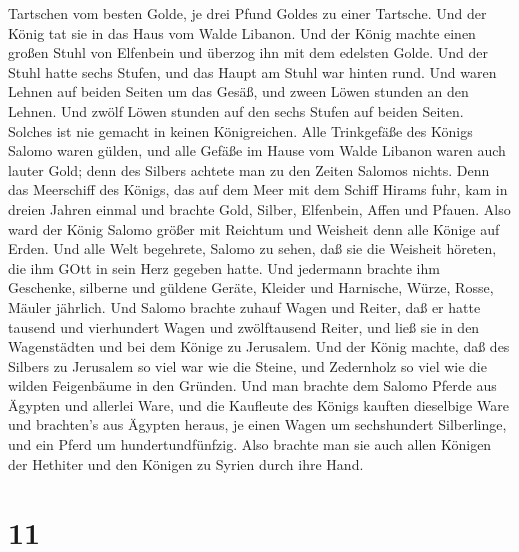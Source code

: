 Tartschen vom besten Golde, je drei Pfund Goldes zu einer Tartsche. Und
der König tat sie in das Haus vom Walde Libanon.  Und der
König machte einen großen Stuhl von Elfenbein und überzog ihn mit dem
edelsten Golde.  Und der Stuhl hatte sechs Stufen, und das
Haupt am Stuhl war hinten rund. Und waren Lehnen auf beiden Seiten um
das Gesäß, und zween Löwen stunden an den Lehnen.  Und
zwölf Löwen stunden auf den sechs Stufen auf beiden Seiten. Solches ist
nie gemacht in keinen Königreichen.  Alle Trinkgefäße des
Königs Salomo waren gülden, und alle Gefäße im Hause vom Walde Libanon
waren auch lauter Gold; denn des Silbers achtete man zu den Zeiten
Salomos nichts.  Denn das Meerschiff des Königs, das auf
dem Meer mit dem Schiff Hirams fuhr, kam in dreien Jahren einmal und
brachte Gold, Silber, Elfenbein, Affen und Pfauen.  Also
ward der König Salomo größer mit Reichtum und Weisheit denn alle Könige
auf Erden.  Und alle Welt begehrete, Salomo zu sehen, daß
sie die Weisheit höreten, die ihm GOtt in sein Herz gegeben hatte.
 Und jedermann brachte ihm Geschenke, silberne und güldene
Geräte, Kleider und Harnische, Würze, Rosse, Mäuler jährlich.
 Und Salomo brachte zuhauf Wagen und Reiter, daß er hatte
tausend und vierhundert Wagen und zwölftausend Reiter, und ließ sie in
den Wagenstädten und bei dem Könige zu Jerusalem.  Und der
König machte, daß des Silbers zu Jerusalem so viel war wie die Steine,
und Zedernholz so viel wie die wilden Feigenbäume in den Gründen.
 Und man brachte dem Salomo Pferde aus Ägypten und allerlei
Ware, und die Kaufleute des Königs kauften dieselbige Ware 
und brachten's aus Ägypten heraus, je einen Wagen um sechshundert
Silberlinge, und ein Pferd um hundertundfünfzig. Also brachte man sie
auch allen Königen der Hethiter und den Königen zu Syrien durch ihre
Hand.

\hypertarget{section-10}{%
\section{11}\label{section-10}}


